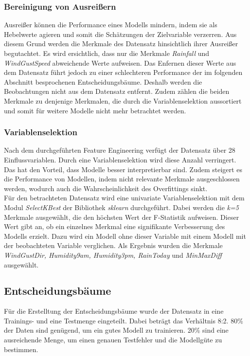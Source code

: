 \subsubsection{Bereinigung von Ausreißern}
Ausreißer können die Performance eines Modells mindern, indem sie als Hebelwerte agieren und somit die Schätzungen der Zielvariable verzerren. Aus diesem Grund werden die Merkmale des Datensatz hinsichtlich ihrer Ausreißer begutachtet. Es wird ersichtlich, dass nur die Merkmale \emph{Rainfall} und \emph{WindGustSpeed} abweichende Werte aufweisen. Das Enfernen dieser Werte aus dem Datensatz führt jedoch zu einer schlechteren Performance der im folgenden Abschnitt besprochenen Entscheidungsbäume. Deshalb werden die Beobachtungen nicht aus dem Datensatz entfernt. Zudem zählen die beiden Merkmale zu denjenige Merkmalen, die durch die Variablenselektion aussortiert und somit für weitere Modelle nicht mehr betrachtet werden.

\subsubsection{Variablenselektion}
Nach dem durchgeführten Feature Engineering verfügt der Datensatz über 28 Einflussvariablen. Durch eine Variablenselektion wird diese Anzahl verringert. Das hat den Vorteil, dass Modelle besser interpretierbar sind. Zudem steigert es die Performance von Modellen, indem nicht relevante Merkmale ausgeschlossen werden, wodurch auch die Wahrscheinlichkeit des Overfittings sinkt.\\
\noindent \hspace*{7mm}
Für den betrachteten Datensatz wird eine univariate Variablenselektion mit dem Modul \emph{SelectKBest} der Bibliothek \emph{sklearn} durchgeführt. Dabei werden die \textit{k=5} Merkmale ausgewählt, die den höchsten Wert der F-Statistik aufweisen. Dieser Wert gibt an, ob ein einzelnes Merkmal eine signifikante Verbesserung des Modells erzielt. Dazu wird ein Modell ohne dieser Variable mit einem Modell mit der beobachteten Variable verglichen. Als Ergebnis wurden  die Merkmale \emph{WindGustDir, Humidity9am, Humidity3pm, RainToday} und \emph{MinMaxDiff} ausgewählt.

\vspace{1cm}
\subsection{Entscheidungsbäume}
Für die Erstelltung der Entscheidungsbäume wurde der Datensatz in eine Trainings- und eine Testmenge eingeteilt. Dabei beträgt das Verhältnis 8:2. 80\% der Daten sind genügend, um ein gutes Modell zu trainieren. 20\% sind eine ausreichende Menge, um einen genauen Testfehler und die Modellgüte zu bestimmen.
